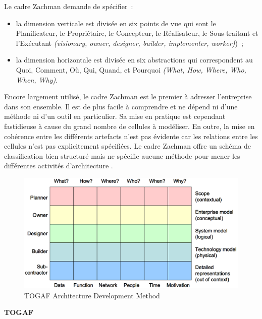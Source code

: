 Le cadre Zachman demande de spécifier~:

	\begin{itemize}

\item la dimension verticale est divisée en six points de vue qui sont le Planificateur, le Propriétaire, le Concepteur, le Réalisateur, le Sous-traitant et l'Exécutant \textit{(visionary, owner, designer, builder, implementer, worker)})~;

\item la dimension horizontale est divisée en six abstractions qui correspondent au Quoi, Comment, Où, Qui, Quand, et Pourquoi \textit{(What, How, Where, Who, When, Why)}.
	\end{itemize}	

Encore largement utilisé, le cadre Zachman est le premier à adresser l'entreprise dans son ensemble. Il est de plus facile à comprendre et ne dépend ni d'une méthode ni d'un outil en particulier. Sa mise en pratique est cependant fastidieuse à cause du grand nombre de cellules à modéliser. En outre, la mise en cohérence entre les différents artefacts n'est pas évidente car les relations entre les cellules n'est pas explicitement spécifiées. Le cadre Zachman offre un schéma de classification bien structuré mais ne spécifie aucune méthode pour mener les différentes activités d'architecture \cite{lankhorst2013enterprise}.


\begin{figure}[!htbp]
 \begin{center}
  \includegraphics[width=1\textwidth]{figures/images/Chapitre1/zachman.png}
 \end{center}
 \caption{TOGAF Architecture Development Method  \protect\cite{zachman1987framework}}
 \label{fig:Zachman}
\end{figure}

\textbf{TOGAF} 

